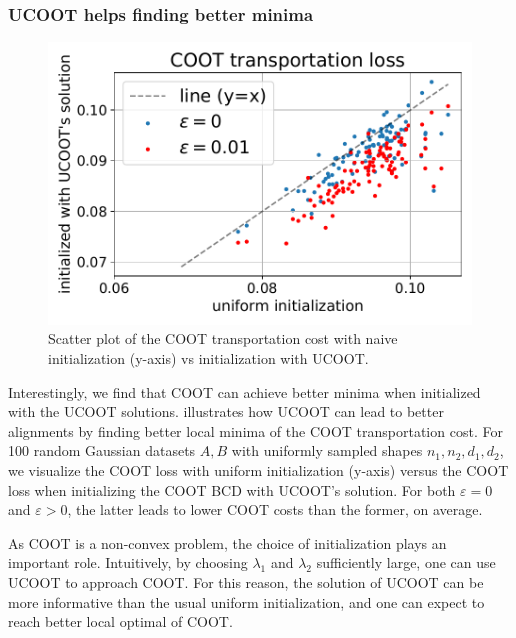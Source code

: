 \subsubsection{UCOOT helps finding better minima}

\setlength{\intextsep}{0pt}
\begin{figure}
  \centering
  \vspace{-15pt}
  \includegraphics[width=\linewidth]{./Chapitre3/fig/init.pdf}
  \vspace*{-10mm}
  \caption{Scatter plot of the COOT transportation cost with naive initialization (y-axis)
  vs initialization with UCOOT.
  \label{fig:init}}
\end{figure}
Interestingly, we find that COOT can achieve better minima when initialized with the UCOOT solutions.
 illustrates how UCOOT can lead to better alignments by finding
better local minima of the COOT transportation cost. For 100 random Gaussian datasets
$A, B$ with uniformly sampled shapes $n_1, n_2, d_1, d_2$, we visualize the COOT loss
with uniform initialization (y-axis) versus the COOT loss when initializing the COOT BCD
with UCOOT's solution. For both $\varepsilon = 0$ and $\varepsilon > 0$,
the latter leads to lower COOT costs than the former, on average.

As COOT is a non-convex problem, the choice of initialization plays an important role.
Intuitively, by choosing $\lambda_1$ and $\lambda_2$ sufficiently large,
one can use UCOOT to approach COOT. For this reason, the solution of UCOOT can be more informative
than the usual uniform initialization, and one can expect to reach better local optimal of COOT.

